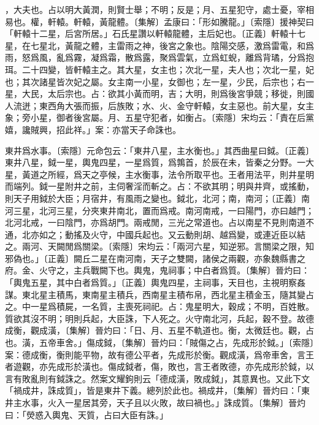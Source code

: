 ，大夫也。占以明大黃潤，則賢士舉；不明；反是；月、五星犯守，處士憂，宰相易也。權，軒轅。軒轅，黃龍體。〔集解〕孟康曰：「形如騰龍。」〔索隱〕援神契曰「軒轅十二星，后宮所居。」石氏星讚以軒轅龍體，主后妃也。〔正義〕軒轅十七星，在七星北，黃龍之體，主雷雨之神，後宮之象也。陰陽交感，激爲雷電，和爲雨，怒爲風，亂爲霧，凝爲霜，散爲露，聚爲雲氣，立爲虹蜺，離爲背璚，分爲抱珥。二十四變，皆軒轅主之。其大星，女主也；次北一星，夫人也；次北一星，妃也；其次諸星皆次妃之屬。女主南一小星，女御也；左一星，少民，后宗也；右一星，大民，太后宗也。占：欲其小黃而明，吉；大明，則爲後宮爭競；移徙，則國人流迸；東西角大張而振，后族敗；水、火、金守軒轅，女主惡也。前大星，女主象；旁小星，御者後宮屬。月、五星守犯者，如衡占。〔索隱〕宋均云：「責在后黨嬉，讒賊興，招此祥。」案：亦當天子命誅也。

東井爲水事。〔索隱〕元命包云：「東井八星，主水衡也。」其西曲星曰鉞。〔正義〕東井八星，鉞一星，輿鬼四星，一星爲質，爲鶉首，於辰在未，皆秦之分野。一大星，黃道之所經，爲天之亭候，主水衡事，法令所取平也。王者用法平，則井星明而端列。鉞一星附井之前，主伺奢淫而斬之。占：不欲其明；明與井齊，或搖動，則天子用鉞於大臣；月宿井，有風雨之變也。鉞北，北河；南，南河；〔正義〕南河三星，北河三星，分夾東井南北，置而爲戒。南河南戒，一曰陽門，亦曰越門；北河北戒，一曰陰門，亦爲胡門。兩戒閒，三光之常道也。占以南星不見則南道不通，北亦如之；動搖及火守，中國兵起也。又云動則胡、越爲變，或連近臣以結之。兩河、天闕閒爲關梁。〔索隱〕宋均云：「兩河六星，知逆邪。言關梁之限，知邪偽也。」〔正義〕闕丘二星在南河南，天子之雙闕，諸侯之兩觀，亦象魏縣書之府。金、火守之，主兵戰闕下也。輿鬼，鬼祠事；中白者爲質。〔集解〕晉灼曰：「輿鬼五星，其中白者爲質。」〔正義〕輿鬼四星，主祠事，天目也，主視明察姦謀。東北星主積馬，東南星主積兵，西南星主積布帛，西北星主積金玉，隨其變占之。中一星爲積屍，一名質，主喪死祠祀。占：鬼星明大，穀成；不明，百姓散。質欲其沒不明；明則兵起，大臣誅，下人死之。火守南北河，兵起，穀不登。故德成衡，觀成潢，〔集解〕晉灼曰：「日、月、五星不軌道也。衡，太微廷也。觀，占也。潢，五帝車舍。」傷成鉞，〔集解〕晉灼曰：「賊傷之占，先成形於鉞。」〔索隱〕案：德成衡，衡則能平物，故有德公平者，先成形於衡。觀成潢，爲帝車舍，言王者遊觀，亦先成形於潢也。傷成鉞者，傷，敗也，言王者敗德，亦先成形於鉞，以言有敗亂則有鉞誅之。然案文耀鉤則云「德成潢，敗成鉞」，其意異也。又此下文「禍成井，誅成質」，皆是東井下義。總列於此也。禍成井，〔集解〕晉灼曰：「東井主水事，火入一星居其旁，天子且以火敗，故曰禍也。」誅成質。〔集解〕晉灼曰：「熒惑入輿鬼、天質，占曰大臣有誅。」

